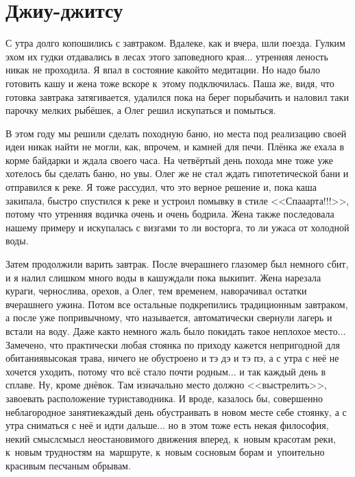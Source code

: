 \chapter{Джиу-джитсу} 

С утра долго копошились с завтраком. Вдалеке, как и вчера, шли поезда. Гулким эхом их гудки отдавались в лесах этого заповедного края$\ldots$ утренняя леность никак не проходила. Я впал в состояние какой\sdash то медитации. Но надо было готовить кашу и жена тоже вскоре к~этому подключилась. Паша же, видя, что готовка завтрака затягивается, удалился пока на берег порыбачить и наловил таки парочку мелких рыбёшек, а Олег решил искупаться и помыться. 

В этом году мы решили сделать походную баню, но места под реализацию своей идеи никак найти не могли, как, впрочем, и камней для печи. Плёнка же ехала в корме байдарки и ждала своего часа. На четвёртый день похода мне тоже уже хотелось бы сделать баню, но увы. Олег же не стал ждать гипотетической бани и отправился к реке. Я тоже рассудил, что это верное решение и, пока каша закипала, быстро спустился к реке и устроил помывку в стиле <<Спа\sdash а\sdash арта!!!>>, потому что утренняя водичка очень и очень бодрила. Жена также последовала нашему примеру и искупалась с визгами то ли восторга, то ли ужаса от холодной воды. 

Затем продолжили варить завтрак. После вчерашнего глазомер был немного сбит, и я налил слишком много воды в кашу\mdash ждали пока выкипит. Жена нарезала кураги, чернослива, орехов, а Олег, тем временем, наворачивал остатки вчерашнего ужина. Потом все остальные подкрепились традиционным завтраком, а после уже по\sdash привычному, что называется, автоматически свернули лагерь и встали на воду. Даже как\sdash то немного жаль было покидать такое неплохое место$\ldots$ Замечено, что практически любая стоянка по приходу кажется непригодной для обитания\mdash высокая трава, ничего не обустроено и тэ дэ и тэ пэ, а с утра с неё не хочется уходить, потому что всё стало почти родным$\ldots$ и так каждый день в сплаве. Ну, кроме днёвок. Там изначально место должно <<выстрелить>>, завоевать расположение туриста\sdash водника. И вроде, казалось бы, совершенно неблагородное занятие\mdash каждый день обустраивать в новом месте себе стоянку, а с утра сниматься с неё и идти дальше$\ldots$ но в этом тоже есть некая философия, некий смысл\mdash смысл неостановимого движения вперед, к~новым красотам реки, к~новым трудностям на~маршруте, к~новым сосновым борам и~упоительно красивым песчаным обрывам.

